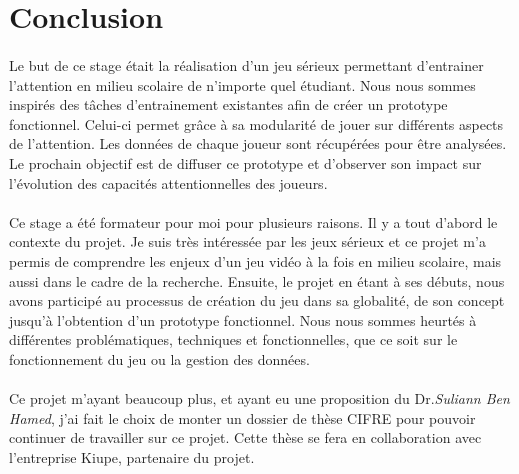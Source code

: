 \section*{Conclusion}

\paragraph{}Le but de ce stage était la réalisation d'un jeu sérieux permettant d'entrainer l'attention en milieu scolaire de n'importe quel étudiant. Nous nous sommes inspirés des
tâches d'entrainement existantes afin de créer un prototype fonctionnel. Celui-ci permet grâce à sa modularité de jouer sur différents aspects de l'attention. Les données de chaque
joueur sont récupérées pour être analysées. Le prochain objectif est de diffuser ce prototype et d'observer son impact sur l'évolution des capacités attentionnelles des joueurs.

\paragraph{}Ce stage a été formateur pour moi pour plusieurs raisons. Il y a tout d'abord le contexte du projet. Je suis très intéressée par les jeux sérieux et ce projet m'a permis de
comprendre les enjeux d'un jeu vidéo à la fois en milieu scolaire, mais aussi dans le cadre de la recherche. Ensuite, le projet en étant à ses débuts, nous avons participé au processus
de création du jeu dans sa globalité, de son concept jusqu'à l'obtention d'un prototype fonctionnel. Nous nous sommes heurtés à différentes problématiques, techniques et fonctionnelles,
que ce soit sur le fonctionnement du jeu ou la gestion des données.

\paragraph{}Ce projet m'ayant beaucoup plus, et ayant eu une proposition du Dr.\emph{Suliann Ben Hamed}, j'ai fait le choix de monter un dossier de thèse CIFRE pour pouvoir continuer de
travailler sur ce projet. Cette thèse se fera en collaboration avec l'entreprise Kiupe, partenaire du projet.

\newpage